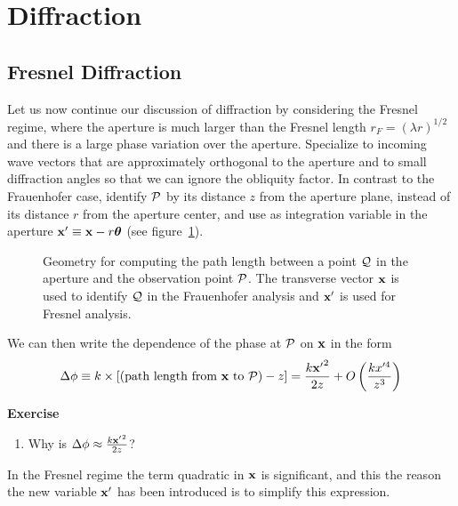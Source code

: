 \documentclass{article}
\begin{document}
\setcounter{section}{6}
\section{Diffraction }

\subsection{Fresnel Diffraction}

Let us now continue our discussion of diffraction by considering the Fresnel
regime, where the aperture is much larger than the Fresnel length $r_F=(\lambda r)^{1/2}$ and
there is a large phase variation over the aperture. Specialize to incoming wave
vectors that are approximately orthogonal to the aperture and to small 
diffraction angles so that we can ignore the obliquity factor. In contrast 
to the Frauenhofer case, identify $\cal{P}$ by its distance $z$ from the
aperture plane, instead of its distance $r$ from the aperture center, and
use as integration variable in the aperture 
${\bf x'}\equiv{\bf x}-r{\bm\theta}$ (see figure~\ref{fig:path-length}).

\begin{figure}[h!]
  \hfil{}\hfil
  \caption{Geometry for computing the path length between a point $\cal{Q}$ in 
the aperture and the observation point $\cal{P}$. The transverse vector 
$\bf{x}$ is used to identify $\cal{Q}$ in the Frauenhofer analysis and 
$\bf{x'}$ is used for Fresnel analysis.}
  \label{fig:path-length}
\end{figure}
\noindent
We can then write the dependence of the phase at $\cal{P}$ on ${\bf x}$ in 
the form
\[
\Delta\phi\equiv k\times[({\rm path~length~from~}{\bf x}~{\rm to}~{\cal P})-z]
 = {k{\bf x'}^2\over 2z}+O\left({kx'^4\over z^3}\right)
\]

{\bf Exercise}

\begin{enumerate}
\item Why is $\Delta\phi\approx {k{\bf x'}^2\over 2z}$?
\setcounter{count}{\value{enumi}}
\end{enumerate}

\noindent
In the Fresnel regime the term quadratic in ${\bf x}$ is significant, and
this the reason the new variable ${\bf x'}$ has been introduced is to simplify 
this expression. 
\end{document}
